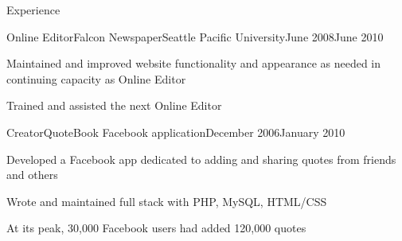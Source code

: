 \documentclass[letterpaper,10pt]{article}
\newcommand{\optarg}[2][]{%
  \ifthenelse{\isempty{#1}}%
    {}%
    {#2}%
}
\newenvironment{res_section}[1]{%
  \vskip 6pt
  \noindent
  {\Large \textbf{#1}}\\
  \rule[8pt]{\textwidth}{0.5pt}
  \vskip -8pt
}{
}
\newenvironment{res_subsection}[1]{%
  \vskip 4pt
  \noindent
  \textbf{\large{#1}}
  \begin{itemize}
}{
  \end{itemize}
}
\newenvironment{res_experienceitem}[5]{%
  \begin{res_subsection}{#1 - \em{%
  #2%
  \optarg[#3]{, #3}%
  \optarg[#4]{, #4}%
  \optarg[#5]{ -- #5}%
  }}
}{
  \end{res_subsection}
}
\begin{document}
\begin{res_section}{Experience}
\begin{res_experienceitem}{Online Editor}{Falcon Newspaper}{Seattle Pacific University}{June 2008}{June 2010}
  \item Maintained and improved website functionality and appearance as needed in continuing capacity as Online Editor
  \item Trained and assisted the next Online Editor
\end{res_experienceitem}
\begin{res_experienceitem}{Creator}{QuoteBook Facebook application}{}{December 2006}{January 2010}
  \item Developed a Facebook app dedicated to adding and sharing quotes from friends and others
  \item Wrote and maintained full stack with PHP, MySQL, HTML/CSS
  \item At its peak, 30,000 Facebook users had added 120,000 quotes
\end{res_experienceitem}
\end{res_section}
\end{document}
